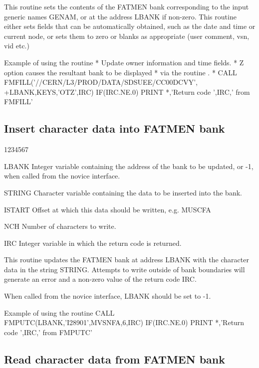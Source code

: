 This routine sets the contents of the FATMEN bank corresponding to
the input generic names GENAM, or at the address LBANK if non-zero.
This routine either sets fields that can be automatically obtained,
such as the date and time or current node, or sets them to zero or
blanks as appropriate (user comment, vsn, vid etc.)
\begin{XMPt}{Example of using the \protect{} routine}
*     Update owner information and time fields.
*     Z option causes the resultant bank to be displayed
*     via the routine \protect{}.
*
      CALL FMFILL('//CERN/L3/PROD/DATA/SDSUEE/CC00DCVY',
     +LBANK,KEYS,'OTZ',IRC)
      IF(IRC.NE.0) PRINT *,'Return code ',IRC,' from FMFILL'
\end{XMPt}

\subsection{Insert character data into FATMEN bank}


\begin{DLtt}{1234567}
\item [LBANK]
Integer variable containing the address of the bank to be updated,
or -1, when called from
the novice interface.
\item[STRING ]
Character variable containing the data to be inserted into the bank.
\item[ISTART]
Offset at which this data should be written, e.g. MUSCFA
\item[NCH]
Number of characters to write.
\item[IRC]
Integer variable in which the return code is returned.
\end{DLtt}

This routine updates the FATMEN bank at address LBANK with the
character data in the string STRING. Attempts to write outside of
bank boundaries will generate an error and a non-zero value of the
return code IRC.

When called from the novice interface, LBANK should be set to -1.
\begin{XMPt} {Example of using the \protect{} routine}
      CALL FMPUTC(LBANK,'I28901',MVSNFA,6,IRC)
      IF(IRC.NE.0) PRINT *,'Return code ',IRC,' from FMPUTC'
\end{XMPt}

\subsection{Read character data from FATMEN bank}

